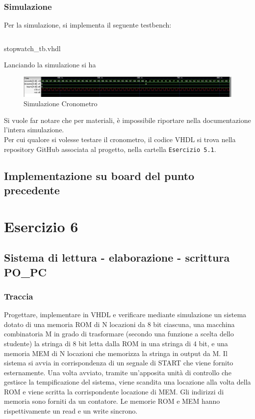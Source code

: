 \subsection{Simulazione}
Per la simulazione, si implementa il seguente testbench:
\begin{code}
    \inputminted[frame=lines, framesep=2mm, baselinestretch=1.2, bgcolor=LightGray, fontsize=\footnotesize, linenos]{vhdl}{vhdl_files/Esercizio_5.1/stopwatch_tb.vhdl}
    \caption{stopwatch\_tb.vhdl}
    \label{lst:stopwatch_tb}
\end{code}

Lanciando la simulazione si ha 
\begin{figure}[H]
	\centering
	\includegraphics[width=1\textwidth]{img/stopwatch_sim}
	\caption{Simulazione Cronometro}
	\label{stpwth_sim} 
\end{figure}
Si vuole far notare che per materiali, è impossibile riportare nella documentazione l'intera simulazione.\\
Per cui qualore si volesse testare il cronometro, il codice VHDL si trova nella repository GitHub associata al progetto, nella cartella \texttt{Esercizio 5.1}.

\section{Implementazione su board del punto precedente}

\chapter{Esercizio 6}
\section{Sistema di lettura - elaborazione - scrittura PO\_PC}
\subsection{Traccia}
 Progettare, implementare in VHDL e verificare mediante simulazione un sistema dotato di una memoria ROM di N locazioni da 8 bit ciascuna, una macchina combinatoria M in grado di trasformare (secondo una funzione a scelta dello studente) la stringa di 8 bit letta dalla ROM in una stringa di 4 bit, e una memoria MEM di N locazioni che memorizza la stringa in output da M. Il sistema si avvia in corrispondenza di un segnale di START che viene fornito esternamente. Una volta avviato, tramite un’apposita unità di controllo che gestisce la tempificazione del sistema, viene scandita una locazione alla volta della ROM e viene scritta la corrispondente locazione di MEM. Gli indirizzi di memoria sono forniti da un contatore. Le memorie ROM e MEM hanno rispettivamente un read e un write sincrono.
